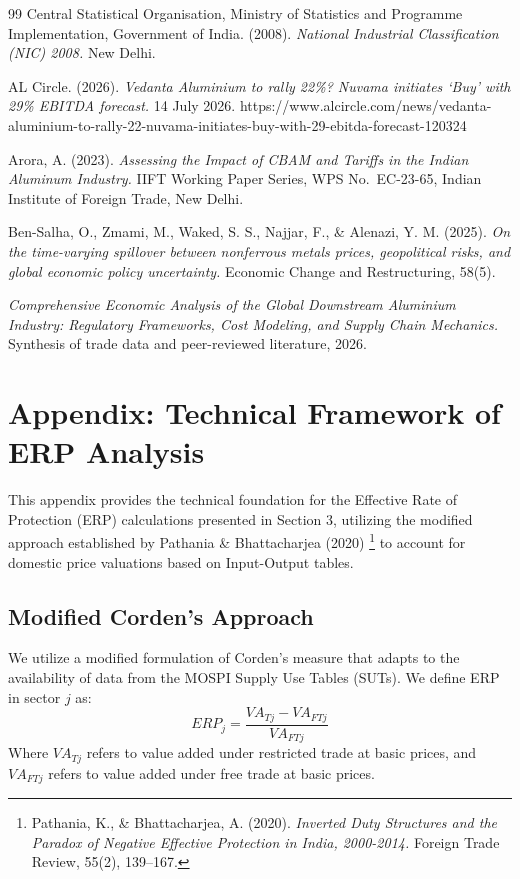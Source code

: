 \documentclass[11pt, a4paper]{article}
\numberwithin{figure}{section}
\numberwithin{table}{section}
\begin{document}
\begin{thebibliography}{99}
Central Statistical Organisation, Ministry of Statistics and Programme Implementation, Government of India. (2008).
\textit{National Industrial Classification (NIC) 2008.}
New Delhi.

AL Circle. (2026).
\textit{Vedanta Aluminium to rally 22\%? Nuvama initiates `Buy' with 29\% EBITDA forecast.}
14 July 2026. https://www.alcircle.com/news/vedanta-aluminium-to-rally-22-nuvama-initiates-buy-with-29-ebitda-forecast-120324

Arora, A. (2023).
\textit{Assessing the Impact of CBAM and Tariffs in the Indian Aluminum Industry.}
IIFT Working Paper Series, WPS No.~EC-23-65, Indian Institute of Foreign Trade, New Delhi.

Ben-Salha, O., Zmami, M., Waked, S. S., Najjar, F., \& Alenazi, Y. M. (2025).
\textit{On the time-varying spillover between nonferrous metals prices, geopolitical risks, and global economic policy uncertainty.}
Economic Change and Restructuring, 58(5).

\textit{Comprehensive Economic Analysis of the Global Downstream Aluminium Industry: Regulatory Frameworks, Cost Modeling, and Supply Chain Mechanics.}
Synthesis of trade data and peer-reviewed literature, 2026.

\end{thebibliography}

\newpage
\appendix
\section{Appendix: Technical Framework of ERP Analysis}
This appendix provides the technical foundation for the Effective Rate of Protection (ERP) calculations presented in Section 3, utilizing the modified approach established by Pathania \& Bhattacharjea (2020) \cite{pathania2020}\footnote{Pathania, K., \& Bhattacharjea, A. (2020). \textit{Inverted Duty Structures and the Paradox of Negative Effective Protection in India, 2000-2014.} Foreign Trade Review, 55(2), 139--167.} to account for domestic price valuations based on Input-Output tables.

\subsection{Modified Corden's Approach}
We utilize a modified formulation of Corden's measure that adapts to the availability of data from the MOSPI Supply Use Tables (SUTs). We define ERP in sector $j$ as:
$$ ERP_j = \frac{VA_{Tj} - VA_{FTj}}{VA_{FTj}} $$
Where $VA_{Tj}$ refers to value added under restricted trade at basic prices, and $VA_{FTj}$ refers to value added under free trade at basic prices.
\end{document}
